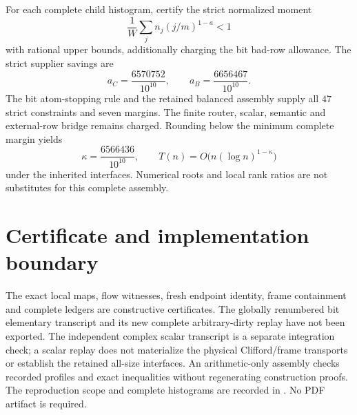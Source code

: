 \documentclass[11pt]{article}
\begin{document}
For each complete child histogram, certify the strict normalized moment
\[
 \frac{1}{W}\sum_j n_j(j/m)^{1-a}<1
\]
with rational upper bounds, additionally charging the bit bad-row allowance.
The strict supplier savings are
\[
 a_C=\frac{6570752}{10^{10}},\qquad
 a_B=\frac{6656467}{10^{10}}.
\]
The bit atom-stopping rule and the retained balanced assembly supply all
$47$ strict constraints and seven margins. The finite router, scalar,
semantic and external-row bridge remains charged. Rounding below the
minimum complete margin yields
\[
 \kappa=\frac{6566436}{10^{10}},\qquad
 T(n)=O\bigl(n(\log n)^{1-\kappa}\bigr)
\]
under the inherited interfaces. Numerical roots and local rank ratios
are not substitutes for this complete assembly.

\section{Certificate and implementation boundary}
The exact local maps, flow witnesses, fresh endpoint identity, frame
containment and complete ledgers are constructive certificates.
The globally renumbered bit elementary transcript and its new complete
arbitrary-dirty replay have not been exported. The independent complex
scalar transcript is a separate integration check; a scalar replay does
not materialize the physical Clifford/frame transports or establish the
retained all-size interfaces. An arithmetic-only assembly checks recorded
profiles and exact inequalities without regenerating construction proofs.
The reproduction scope and complete histograms are recorded in
. No PDF artifact is required.
\end{document}
